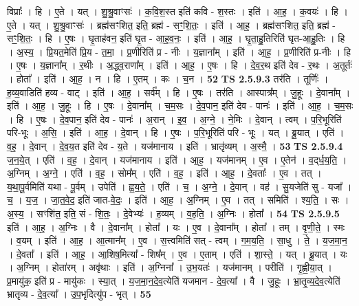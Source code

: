 \documentclass[17pt]{extarticle}
\begin{document}
                  विप्राः᳚ । हि । ए॒ते । यत् । शु॒श्रु॒वाꣳसः॑ । क॒वि॒श॒स्त इति॑ कवि - श॒स्तः । इति॑ । आ॒ह॒ । क॒वयः॑ । हि । ए॒ते । यत् । शु॒श्रु॒वाꣳसः॑ । ब्रह्म॑सꣳशित॒ इति॒ ब्रह्म॑ - सꣳ॒॒शि॒तः॒ । इति॑ । आ॒ह॒ । ब्रह्म॑सꣳशित॒ इति॒ ब्रह्म॑ - सꣳ॒॒शि॒तः॒ । हि । ए॒षः । घृ॒ताह॑वन॒ इति॑ घृ॒त - आ॒ह॒व॒नः॒ । इति॑ । आ॒ह॒ । घृ॒ता॒हु॒तिरिति॑ घृत-आ॒हु॒तिः । हि । अ॒स्य॒ । प्रि॒यत॒मेति॑ प्रि॒य - त॒मा॒ । प्र॒णीरिति॑ प्र - नीः । य॒ज्ञाना᳚म् । इति॑ । आ॒ह॒ । प्र॒णीरिति॑ प्र-नीः । हि । ए॒षः । य॒ज्ञाना᳚म् । र॒थीः । अ॒द्ध्व॒राणा᳚म् । इति॑ । आ॒ह॒ । ए॒षः । हि । दे॒व॒र॒थ इति॑ देव - र॒थः । अ॒तूर्तः॑ । होता᳚ । इति॑ । आ॒ह॒ । न । हि । ए॒तम् । कः । च॒न । \textbf{  52} \newline
                  \newline
                                \textbf{ TS 2.5.9.3} \newline
                  तर॑ति । तूर्णिः॑ । ह॒व्य॒वाडिति॑ हव्य - वाट् । इति॑ । आ॒ह॒ । सर्व᳚म् । हि । ए॒षः । तर॑ति । आस्पात्र᳚म् । जु॒हूः । दे॒वाना᳚म् । इति॑ । आ॒ह॒ । जु॒हूः । हि । ए॒षः । दे॒वाना᳚म् । च॒म॒सः । दे॒व॒पान॒ इति॑ देव - पानः॑ । इति॑ । आ॒ह॒ । च॒म॒सः । हि । ए॒षः । दे॒व॒पान॒ इति॑ देव - पानः॑ । अ॒रान् । इ॒व॒ । अ॒ग्ने॒ । ने॒मिः । दे॒वान् । त्वम् । प॒रि॒भूरिति॑ परि-भूः । अ॒सि॒ । इति॑ । आ॒ह॒ । दे॒वान् । हि । ए॒षः । प॒रि॒भूरिति॑ परि - भूः । यत् । ब्रू॒यात् । एति॑ । व॒ह॒ । दे॒वान् । दे॒व॒य॒त इति॑ देव - य॒ते । यज॑मानाय । इति॑ । भ्रातृ॑व्यम् । अ॒स्मै॒ । \textbf{  53} \newline
                  \newline
                                \textbf{ TS 2.5.9.4} \newline
                  ज॒न॒ये॒त् । एति॑ । व॒ह॒ । दे॒वान् । यज॑मानाय । इति॑ । आ॒ह॒ । यज॑मानम् । ए॒व । ए॒तेन॑ । व॒द्‌र्ध॒य॒ति॒ । अ॒ग्निम् । अ॒ग्ने॒ । एति॑ । व॒ह॒ । सोम᳚म् । एति॑ । व॒ह॒ । इति॑ । आ॒ह॒ । दे॒वताः᳚ । ए॒व । तत् । य॒था॒पू॒र्वमिति॑ यथा - पू॒र्वम् । उपेति॑ । ह्व॒य॒ते॒ । एति॑ । च॒ । अ॒ग्ने॒ । दे॒वान् । वह॑ । सु॒यजेति॑ सु - यजा᳚ । च॒ । य॒ज॒ । जा॒त॒वे॒द॒ इति॑ जात-वे॒दः॒ । इति॑ । आ॒ह॒ । अ॒ग्निम् । ए॒व । तत् । समिति॑ । श्य॒ति॒ । सः । अ॒स्य॒ । सꣳशि॑त॒ इति॒ सं - शि॒तः॒ । दे॒वेभ्यः॑ । ह॒व्यम् । व॒ह॒ति॒ । अ॒ग्निः । होता᳚ । \textbf{  54} \newline
                  \newline
                                \textbf{ TS 2.5.9.5} \newline
                  इति॑ । आ॒ह॒ । अ॒ग्निः । वै । दे॒वाना᳚म् । होता᳚ । यः । ए॒व । दे॒वाना᳚म् । होता᳚ । तम् । वृ॒णी॒ते॒ । स्मः । व॒यम् । इति॑ । आ॒ह॒ । आ॒त्मान᳚म् । ए॒व । स॒त्त्वमिति॑ सत् - त्वम् । ग॒म॒य॒ति॒ । सा॒धु । ते॒ । य॒ज॒मा॒न॒ । दे॒वता᳚ । इति॑ । आ॒ह॒ । आ॒शिष॒मित्या᳚ - शिष᳚म् । ए॒व । ए॒ताम् । एति॑ । शा॒स्ते॒ । यत् । ब्रू॒यात् । यः । अ॒ग्निम् । होता॑रम् । अवृ॑थाः । इति॑ । अ॒ग्निना᳚ । उ॒भ॒यतः॑ । यज॑मानम् । परीति॑ । गृ॒ह्णी॒या॒त् । प्र॒मायु॑क॒ इति॑ प्र - मायु॑कः । स्या॒त् । य॒ज॒मा॒न॒दे॒व॒त्येति॑ यजमान - दे॒व॒त्या᳚ । वै । जु॒हूः । भ्रा॒तृ॒व्य॒दे॒व॒त्येति॑ भ्रातृव्य - दे॒व॒त्या᳚ । उ॒प॒भृदित्यु॑प - भृत् । \textbf{  55} \newline
\end{document}
